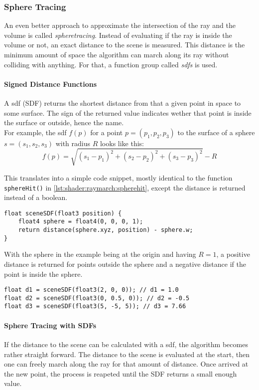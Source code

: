 \pagebreak
\subsubsection{Sphere Tracing}
An even better approach to approximate the intersection of the ray and the volume is called \textit{\gls{spheretracing}}. 
Instead of evaluating if the ray is inside the volume or not, an exact distance to the scene is measured. This distance is the minimum amount of space the algorithm can march along its ray without colliding with anything.
For that, a function group called \textit{\gls{sdf}s} is used.

\paragraph{Signed Distance Functions}
A \gls{sdf} (SDF) returns the shortest distance from that a given point in space to some surface.
The sign of the returned value indicates wether that point is inside the surface or outside, hence the name.
\\
For example, the \gls{sdf} $f(p)$ for a point $p=(p_1, p_2, p_3)$ to the surface of a sphere $s=(s_1, s_2, s_3)$ with radius $R$ looks like this:
$$ f(p) = \sqrt{(s_1 - p_1)^2 + (s_2 - p_2)^2 + (s_3 - p_3)^2} - R $$

\noindent
This translates into a simple code snippet, mostly identical to the function \lstinline[language=HLSL]{sphereHit()} in \autoref{lst:shader:raymarch:spherehit}, except the distance is returned instead of a boolean.
\begin{lstlisting}[language=HLSL, caption=Implementation of a signed distance function for a sphere., label=lst:shader:raymarch:spheredistance]
float sceneSDF(float3 position) {
    float4 sphere = float4(0, 0, 0, 1);
    return distance(sphere.xyz, position) - sphere.w;
}
\end{lstlisting}

\noindent
With the sphere in the example being at the origin and having $R = 1$, a positive distance is returned for points outside the sphere and a negative distance if the point is inside the sphere.
\begin{lstlisting}[language=HLSL]
float d1 = sceneSDF(float3(2, 0, 0)); // d1 = 1.0
float d2 = sceneSDF(float3(0, 0.5, 0)); // d2 = -0.5
float d3 = sceneSDF(float3(5, -5, 5)); // d3 = 7.66
\end{lstlisting}

\paragraph{Sphere Tracing with SDFs}
If the distance to the scene can be calculated with a \gls{sdf}, the algorithm becomes rather straight forward. The distance to the scene is evaluated at the start, then one can freely march along the ray for that amount of distance. Once arrived at the new point, the process is reapeted until the SDF returns a small enough value.

